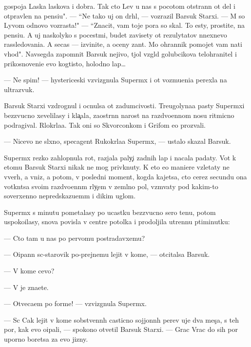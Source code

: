 \documentclass[12pt]{book}
\begin{document}
gospoja Laska laskova i dobra. Tak cto Lev u nas s pocotom otstran{\e}n ot del i otpravlen na pensi{\y}u". — ``Ne tako{\y} uj on dr{\ia}hl{\yi}{\y}, — vozrazil Barsuk Starxi{\y}. — M{\yi} so Lyvom odnovo vozrasta!" — ``Znacit, vam toje pora so skal{\yi}. To {\y}esty, prostite, na pensi{\y}u. A uj naskolyko s pocest{\ia}mi, budet zavisety ot rezulytatov n{\yi}nexnevo rassledovani{\y}a. A se{\y}cas — izvinite, {\y}a oceny zan{\ia}t. Mo{\y} ohrannik pomojet vam na{\y}ti v{\yi}hod". Navsegda zapomnit Barsuk nejivo{\y}, t{\ia}jol{\yi}{\y} vzgl{\ia}d golubcikova telohranitel{\ia} i prikosnoveni{\y}e {\y}evo kogtisto{\y}, holodno{\y} lap{\yi}…

— Ne spim! — hystericeski vzvizgnula Superm{\yi}x i ot vozmu{\x}eni{\y}a perexla na ultrazvuk.

Barsuk Starxi{\y} vzdrognul i ocnulsa ot zadumcivosti. Treugolyna{\y}a pasty Superm{\yi}xi bezzvucno xevelilasy i kla{\c}ala, zaostr{\e}nn{\yi}{\y} narost na razdvo{\y}ennom nosu ritmicno podragival. R{\yi}lokr{\yi}la{\y}a. Tak oni so Skvorconkom i Grifom {\y}e{\y}o prozvali.

— Nicevo ne sl{\yi}xno, specagent Rukokr{\yi}la{\y}a Superm{\yi}x, — ustalo skazal Barsuk.

Superm{\yi}x rezko zahlopnula rot, razjala paly{\c}i zadnih lap i nacala padaty. Vot k etomu Barsuk Starxi{\y} nikak ne mog priv{\yi}knuty. K eto{\y} {\y}e{\y}o maniere vzletaty ne vverh, a vniz, a potom, v posledni{\y} moment, kogda kajetsa, cto cerez secundu ona votkn{\e}tsa svo{\y}im razdvo{\y}enn{\yi}m r{\yi}ly{\c}em v zeml{\ia}no{\y} pol, vzm{\yi}vaty pod kakim-to soverxenno nepredskazu{\y}em{\yi}m i dikim uglom.

Superm{\yi}x s minutu pometalasy po ucastku bezzvucno{\y} sero{\y} ten{\y}u, potom uspoko{\y}ilasy, snova povisla v centre potolka i prodoljila utrenn{\iu}{\y}u p{\ia}\-ti\-mi\-nut\-ku:

— Cto tam u nas po pervomu postradavxemu?

— O{\x}ipann{\yi}{\y} s{\yi}c-star{\y}ov{\x}ik po-prejnemu lejit v kome, — otcitalsa Barsuk.

— V kome cevo?

— V{\yi} je zna{\y}ete.

— Otveca{\y}em po forme! — vzvizgnula Superm{\yi}x.

— S{\yi}c Cak lejit v kome sobstvenn{\yi}h casticno sojjonn{\yi}h per{\y}ev uje dva mes{\ia}{\c}a, s teh por, kak {\y}evo o{\x}ipali, — spoko{\y}no otvetil Barsuk Starxi{\y}. — Grac Vrac do sih por uporno boretsa za {\y}evo jizny.
\end{document}
